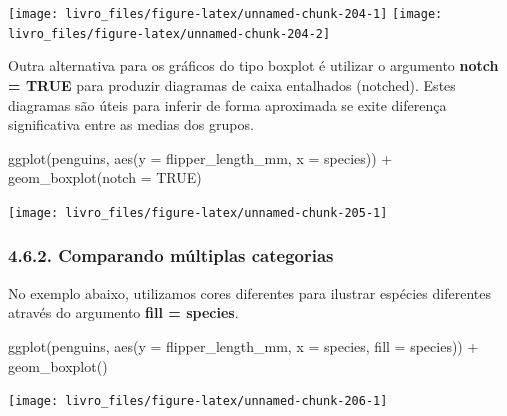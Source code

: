 \documentclass[
]{book}
\newenvironment{Shaded}{\begin{snugshade}}{\end{snugshade}}
\newcommand{\AttributeTok}[1]{\textcolor[rgb]{0.61,0.61,0.61}{#1}}
\newcommand{\ConstantTok}[1]{\textcolor[rgb]{0,0,0}{#1}}
\newcommand{\FunctionTok}[1]{\textcolor[rgb]{0,0,0}{#1}}
\newcommand{\NormalTok}[1]{#1}
\newcommand{\SpecialCharTok}[1]{\textcolor[rgb]{0,0,0}{#1}}
\begin{document}
\begin{center}\texttt{[image: livro\_files/figure-latex/unnamed-chunk-204-1]} \texttt{[image: livro\_files/figure-latex/unnamed-chunk-204-2]} \end{center}

Outra alternativa para os gráficos do tipo boxplot é utilizar o argumento \textbf{notch = TRUE} para produzir diagramas de caixa entalhados (notched). Estes diagramas são úteis para inferir de forma aproximada se exite diferença significativa entre as medias dos grupos.

\begin{Shaded}
\begin{Highlighting}[]
\FunctionTok{ggplot}\NormalTok{(penguins, }\FunctionTok{aes}\NormalTok{(}\AttributeTok{y =}\NormalTok{ flipper\_length\_mm, }\AttributeTok{x =}\NormalTok{ species)) }\SpecialCharTok{+}
  \FunctionTok{geom\_boxplot}\NormalTok{(}\AttributeTok{notch =} \ConstantTok{TRUE}\NormalTok{)}
\end{Highlighting}
\end{Shaded}

\begin{center}\texttt{[image: livro\_files/figure-latex/unnamed-chunk-205-1]} \end{center}

\hypertarget{comparando-muxfaltiplas-categorias-3}{%
\subsubsection{4.6.2. Comparando múltiplas categorias}\label{comparando-muxfaltiplas-categorias-3}}

No exemplo abaixo, utilizamos cores diferentes para ilustrar espécies diferentes através do argumento \textbf{fill = species}.

\begin{Shaded}
\begin{Highlighting}[]

\FunctionTok{ggplot}\NormalTok{(penguins, }
       \FunctionTok{aes}\NormalTok{(}\AttributeTok{y =}\NormalTok{ flipper\_length\_mm, }\AttributeTok{x =}\NormalTok{ species, }\AttributeTok{fill =}\NormalTok{ species)) }\SpecialCharTok{+}
  \FunctionTok{geom\_boxplot}\NormalTok{()}
\end{Highlighting}
\end{Shaded}

\begin{center}\texttt{[image: livro\_files/figure-latex/unnamed-chunk-206-1]} \end{center}
\end{document}
